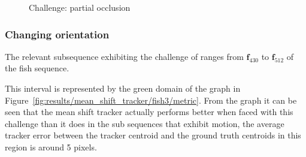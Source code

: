 \begin{figure}
{\begin{tabular}{cccc}
        \end{tabular}}
    \caption{Challenge: partial occlusion\label{fig:mean_shift_partial_occlusion}
 }
\end{figure}

\subsubsection{Changing orientation}
The relevant subsequence exhibiting the challenge of ranges from
$\mathbf{f}_{430}$ to $\mathbf{f}_{512}$ of the fish sequence.  

This interval is represented by the green domain of the graph in
Figure~\ref{fig:results/mean_shift_tracker/fish3/metric}. From the graph it can be
seen that the mean shift tracker actually performs better when faced with this
challenge than it does in the sub sequences that exhibit motion, the average
tracker error between the tracker centroid and the ground truth centroids in
this region is around 5 pixels. 

